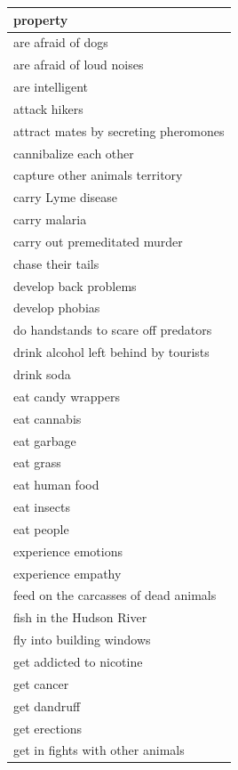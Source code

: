 \documentclass[floatsintext,doc]{apa6}
\begin{document}
\begingroup\fontsize{9pt}{10pt}\selectfont
\begin{longtable}{ |p{3in}|}
  \hline
{\bfseries property} \\ 
  \hline
are afraid of dogs \\ 
   \hline
are afraid of loud noises \\ 
   \hline
are intelligent \\ 
   \hline
attack hikers \\ 
   \hline
attract mates by secreting pheromones \\ 
   \hline
cannibalize each other \\ 
   \hline
capture other animals territory \\ 
   \hline
carry Lyme disease \\ 
   \hline
carry malaria \\ 
   \hline
carry out premeditated murder \\ 
   \hline
chase their tails \\ 
   \hline
develop back problems \\ 
   \hline
develop phobias \\ 
   \hline
do handstands to scare off predators \\ 
   \hline
drink alcohol left behind by tourists \\ 
   \hline
drink soda \\ 
   \hline
eat candy wrappers \\ 
   \hline
eat cannabis \\ 
   \hline
eat garbage \\ 
   \hline
eat grass \\ 
   \hline
eat human food \\ 
   \hline
eat insects \\ 
   \hline
eat people \\ 
   \hline
experience emotions \\ 
   \hline
experience empathy \\ 
   \hline
feed on the carcasses of dead animals \\ 
   \hline
fish in the Hudson River \\ 
   \hline
fly into building windows \\ 
   \hline
get addicted to nicotine \\ 
   \hline
get cancer \\ 
   \hline
get dandruff \\ 
   \hline
get erections \\ 
   \hline
get in fights with other animals \\ 

\end{longtable}
\end{document}
